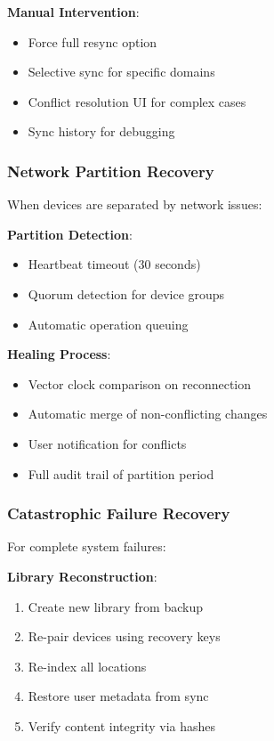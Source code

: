 \documentclass[sigconf]{acmart}
\begin{document}
\textbf{Manual Intervention}:
\begin{itemize}[noitemsep, topsep=0pt]
\item Force full resync option
\item Selective sync for specific domains
\item Conflict resolution UI for complex cases
\item Sync history for debugging
\end{itemize}

\subsubsection{Network Partition Recovery}
When devices are separated by network issues:

\textbf{Partition Detection}:
\begin{itemize}[noitemsep, topsep=0pt]
\item Heartbeat timeout (30 seconds)
\item Quorum detection for device groups
\item Automatic operation queuing
\end{itemize}

\textbf{Healing Process}:
\begin{itemize}[noitemsep, topsep=0pt]
\item Vector clock comparison on reconnection
\item Automatic merge of non-conflicting changes
\item User notification for conflicts
\item Full audit trail of partition period
\end{itemize}

\subsubsection{Catastrophic Failure Recovery}
For complete system failures:

\textbf{Library Reconstruction}:
\begin{enumerate}[noitemsep, topsep=0pt]
\item Create new library from backup
\item Re-pair devices using recovery keys
\item Re-index all locations
\item Restore user metadata from sync
\item Verify content integrity via hashes
\end{enumerate}
\end{document}

